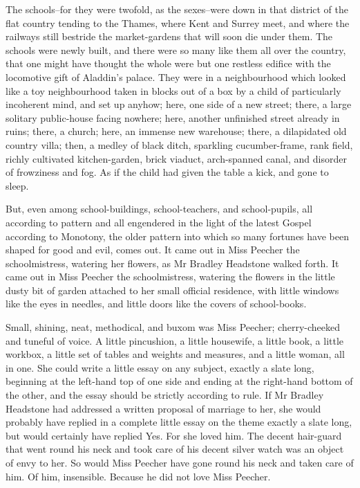The schools--for they were twofold, as the sexes--were down in that
district of the flat country tending to the Thames, where Kent and
Surrey meet, and where the railways still bestride the market-gardens
that will soon die under them. The schools were newly built, and there
were so many like them all over the country, that one might have thought
the whole were but one restless edifice with the locomotive gift of
Aladdin’s palace. They were in a neighbourhood which looked like a toy
neighbourhood taken in blocks out of a box by a child of particularly
incoherent mind, and set up anyhow; here, one side of a new street;
there, a large solitary public-house facing nowhere; here, another
unfinished street already in ruins; there, a church; here, an immense
new warehouse; there, a dilapidated old country villa; then, a medley
of black ditch, sparkling cucumber-frame, rank field, richly cultivated
kitchen-garden, brick viaduct, arch-spanned canal, and disorder of
frowziness and fog. As if the child had given the table a kick, and gone
to sleep.

But, even among school-buildings, school-teachers, and school-pupils,
all according to pattern and all engendered in the light of the latest
Gospel according to Monotony, the older pattern into which so many
fortunes have been shaped for good and evil, comes out. It came out in
Miss Peecher the schoolmistress, watering her flowers, as Mr Bradley
Headstone walked forth. It came out in Miss Peecher the schoolmistress,
watering the flowers in the little dusty bit of garden attached to her
small official residence, with little windows like the eyes in needles,
and little doors like the covers of school-books.

Small, shining, neat, methodical, and buxom was Miss Peecher;
cherry-cheeked and tuneful of voice. A little pincushion, a little
housewife, a little book, a little workbox, a little set of tables and
weights and measures, and a little woman, all in one. She could write
a little essay on any subject, exactly a slate long, beginning at the
left-hand top of one side and ending at the right-hand bottom of the
other, and the essay should be strictly according to rule. If Mr Bradley
Headstone had addressed a written proposal of marriage to her, she would
probably have replied in a complete little essay on the theme exactly a
slate long, but would certainly have replied Yes. For she loved him. The
decent hair-guard that went round his neck and took care of his decent
silver watch was an object of envy to her. So would Miss Peecher have
gone round his neck and taken care of him. Of him, insensible. Because
he did not love Miss Peecher.

